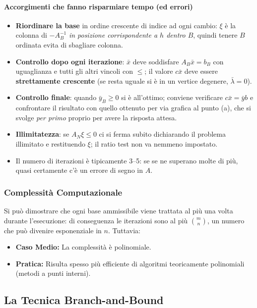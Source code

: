 \documentclass[12pt]{extarticle} %
\begin{document}
\paragraph{Accorgimenti che fanno risparmiare tempo (ed errori)}
\begin{itemize}
    \item \textbf{Riordinare la base} in ordine crescente di indice ad ogni cambio: $\xi$ è la colonna di $-A_B^{-1}$ \textit{in posizione corrispondente a $h$ dentro $B$}, quindi tenere $B$ ordinata evita di sbagliare colonna.
    \item \textbf{Controllo dopo ogni iterazione}: $\bar{x}$ deve soddisfare $A_B\bar{x} = b_B$ con uguaglianza e tutti gli altri vincoli con $\le$; il valore $c\bar{x}$ deve essere \textbf{strettamente crescente} (se resta uguale si è in un vertice degenere, $\bar\lambda = 0$).
    \item \textbf{Controllo finale}: quando $\bar{y}_B \ge 0$ si è all'ottimo; conviene verificare $c\bar{x} = \bar{y}b$ e confrontare il risultato con quello ottenuto per via grafica al punto (a), che si svolge \textit{per primo} proprio per avere la risposta attesa.
    \item \textbf{Illimitatezza}: se $A_N\xi \le 0$ ci si ferma subito dichiarando il problema illimitato e restituendo $\xi$; il ratio test non va nemmeno impostato.
    \item Il numero di iterazioni è tipicamente 3--5: se se ne superano molte di più, quasi certamente c'è un errore di segno in $A$.
\end{itemize}

\subsubsection{Complessità Computazionale}
Si può dimostrare che ogni base ammissibile viene trattata al più una volta durante l'esecuzione: di conseguenza le iterazioni sono al più $\binom{m}{n}$, un numero che può divenire esponenziale in $n$. Tuttavia:
\begin{itemize}
    \item \textbf{Caso Medio:} La complessità è polinomiale.
    \item \textbf{Pratica:} Risulta spesso più efficiente di algoritmi teoricamente polinomiali (metodi a punti interni).
\end{itemize}

\newpage

\subsection{La Tecnica Branch-and-Bound}
\end{document}
